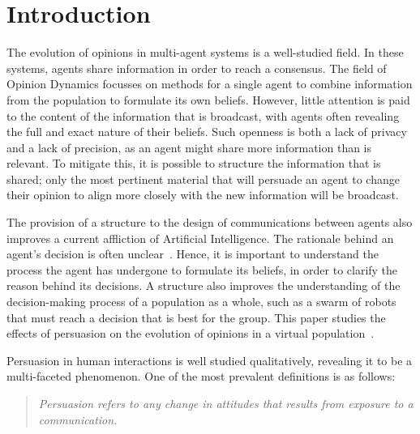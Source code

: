 \newpage


\pagestyle{fancy}
\fancyhf{}
\fancyhead[CE,CO]{\leftmark}
\renewcommand{\headrulewidth}{1pt}
\renewcommand{\footrulewidth}{1pt}

\chapter{Introduction}

The evolution of opinions in multi-agent systems is a well-studied field. In these systems, agents share information in order to reach a consensus. The field of Opinion Dynamics focusses on methods for a single agent to combine information from the population to formulate its own beliefs. However, little attention is paid to the content of the information that is broadcast, with agents often revealing the full and exact nature of their beliefs. Such openness is both a lack of privacy and a lack of precision, as an agent might share more information than is relevant. To mitigate this, it is possible to structure the information that is shared; only the most pertinent material that will persuade an agent to change their opinion to align more closely with the new information will be broadcast.

The provision of a structure to the design of communications between agents also improves a current affliction of Artificial Intelligence. The rationale behind an agent's decision is often unclear~\cite{Doran2017WhatPerspectives}. Hence, it is important to understand the process the agent has undergone to formulate its beliefs, in order to clarify the reason behind its decisions. A structure also improves the understanding of the decision-making process of a population as a whole, such as a swarm of robots that must reach a decision that is best for the group. This paper studies the effects of persuasion on the evolution of opinions in a virtual population~\cite{Harvey2019QuantitativeMarking}. 

Persuasion in human interactions is well studied qualitatively, revealing it to be a multi-faceted phenomenon. One of the most prevalent definitions is as follows:

\begingroup
\addtolength\leftmargini{0.1in}
\begin{quote}
    \textit{Persuasion refers to any change in attitudes that results from exposure to a communication.} \cite{Petty1986CommunicationChange}
\end{quote}
\endgroup


